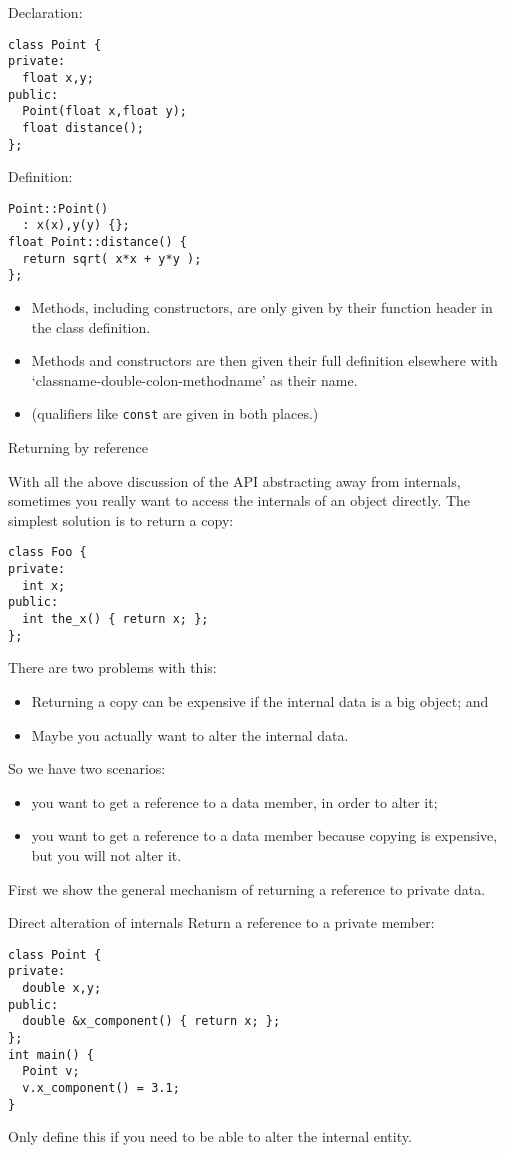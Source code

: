 \begin{multicols}{2}
  Declaration:
\begin{lstlisting}
class Point {
private:
  float x,y;
public:
  Point(float x,float y);
  float distance();
};
\end{lstlisting}
\columnbreak
Definition:
\begin{lstlisting}
Point::Point()
  : x(x),y(y) {};
float Point::distance() {
  return sqrt( x*x + y*y );
};
\end{lstlisting}
\end{multicols}
\begin{itemize}
\item Methods, including constructors, are only given by their function header
  in the class definition.
\item Methods and constructors are then given their full definition elsewhere
  with
  `classname-double-colon-methodname' as their name.
\item (qualifiers like \lstinline{const} are given in both places.)
\end{itemize}

 {Returning by reference}

With all the above discussion of the \ac{API} abstracting away from internals,
sometimes you really want to access the internals of an object directly.
The simplest solution is to return a copy:
\begin{lstlisting}
class Foo {
private:
  int x;
public:
  int the_x() { return x; };
};
\end{lstlisting}
There are two problems with this:
\begin{itemize}
\item
  Returning a copy can be expensive if the internal data is a big object; and
\item 
  Maybe you actually want to alter the internal data.
\end{itemize}

So we have two scenarios:
\begin{itemize}
\item you want to get a reference to a data member, in order to alter it;
\item you want to get a reference to a data member because copying is expensive,
  but you will not alter it.
\end{itemize}

First we show the general mechanism of returning
a reference to private data.

\begin{block}{Direct alteration of internals}
  \label{sl:obj-return-ref}
  Return a reference to a private member:
  \lstset{style=snippetcode}
\begin{lstlisting}
class Point {
private:
  double x,y;
public:
  double &x_component() { return x; };
};
int main() {
  Point v;
  v.x_component() = 3.1;
}
\end{lstlisting}
Only define this if you need to be able to alter the internal entity.
\end{block}

